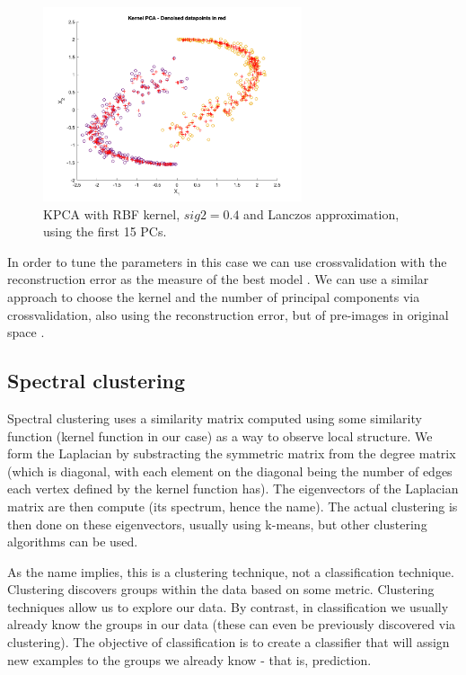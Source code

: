 \documentclass[10pt,a4paper]{article}
\begin{document}
\begin{figure}[h!]
\centering
  \includegraphics[width=3in]{lanc15PC.png}
  \caption{KPCA with RBF kernel, $sig2 = 0.4$ and Lanczos approximation, using the first 15 PCs.}
  \label{fig:lanc15PC}
\end{figure}

In order to tune the parameters in this case we can use crossvalidation with the reconstruction error as the measure of the best model \cite{mikaKernelPCADeNoising}. We can use a similar approach to choose the kernel and the number of principal components via crossvalidation, also using the reconstruction error, but of pre-images in original space \cite{alamHyperparameterSelectionKernel2014}.

\subsection{Spectral clustering}
Spectral clustering uses a similarity matrix computed using some similarity function (kernel function in our case) as a way to observe local structure. We form the Laplacian by substracting the symmetric matrix from the degree matrix (which is diagonal, with each element on the diagonal being the number of edges each vertex defined by the kernel function has). The eigenvectors of the Laplacian matrix are then compute (its spectrum, hence the name). The actual clustering is then done on these eigenvectors, usually using k-means, but other clustering algorithms can be used. 

As the name implies, this is a clustering technique, not a classification technique. Clustering discovers groups within the data based on some metric. Clustering techniques allow us to explore our data. By contrast, in classification we usually already know the groups in our data (these can even be previously discovered via clustering). The objective of classification is to create a classifier that will assign new examples to the groups we already know - that is, prediction.
\end{document}
